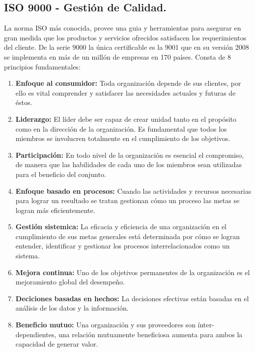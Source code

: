 \documentclass[spanish, fleqn]{article}
\begin{document}
	\subsection{ISO 9000 - Gestión de Calidad.}
	La norma ISO más conocida, provee una guia y herramientas para asegurar en
	gran medida que los productos y servicios ofrecidos satisfacen los
	requerimientos del cliente.
	De la serie 9000 la única certificable es la 9001 que en su versión 2008 se
	implementa en más de un millón de empresas en 170 países\cite{iso9}.
	Consta de 8 principios fundamentales\cite{iso9pdf}:
	\begin{enumerate}
		\item
			\textbf{Enfoque al consumidor:} Toda organización depende de sus 
			clientes, por ello es vital comprender y satisfacer las necesidades
			actuales y futuras de éstos.
		\item
			\textbf{Liderazgo:} El líder debe ser capaz de crear unidad tanto 
			en el propósito como en la dirección de la organización. Es 
			fundamental que todos los miembros se involucren totalmente en el
			cumplimiento de los objetivos.
		\item
			\textbf{Participación:} En todo nivel de la organización es esencial
			el compromiso, de manera que las habilidades de cada uno de los 
			miembros sean utilizadas para el beneficio del conjunto.
		\item
			\textbf{Enfoque basado en procesos:} Cuando las actividades y 
			recursos necesarias para lograr un resultado se tratan gestionan
			cómo un proceso las metas se logran más eficientemente.
		\item
			\textbf{Gestión sistemica:} La eficacia y eficiencia de una 
			organización en el cumplimiento de sus metas generales está 
			determinada por cómo se logran entender, identificar y gestionar
			los procesos interrelacionados como un sistema.
		\item
			\textbf{Mejora continua:} Uno de los objetivos permanentes de la 
			organización es el mejoramiento global del desempeño.
		\item
			\textbf{Deciciones basadas en hechos:} La decisiones efectivas están
			basadas en el análisis de los datos y la información.
		\item
			\textbf{Beneficio mutuo:} Una organización y sus proveedores son 
			ínter-dependientes, una relación mutuamente beneficiosa aumenta
			para ambos la capacidad de generar valor.
	\end{enumerate}
\end{document}
